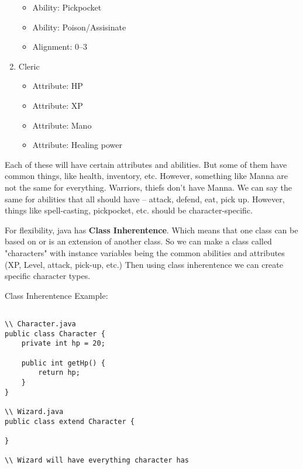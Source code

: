 \documentclass [12 pt, twoside] {article}
\begin{document}
\begin{enumerate}
\begin{itemize}
			\item Ability: Pickpocket
			\item Ability: Poison/Assisinate
			\item Alignment: 0--3
		\end{itemize}
	\item Cleric
		\begin{itemize}
			\item Attribute: HP
			\item Attribute: XP
			\item Attribute: Mano
			\item Attribute: Healing power
		\end{itemize}
\end{enumerate}


Each of these will have certain attributes and abilities.
But some of them have common things, like health, inventory, etc.
However, something like Manna are not the same for everything.
Warriors, thiefs don't have Manna.
We can say the same for abilities that all should have -- attack,
defend, eat, pick up. However, things like spell-casting, pickpocket,
etc. should be character-specific.


For flexibility, java has \textbf{Class Inherentence}. Which means
that one class can be based on or is an extension of another class.
So we can make a class called "characters" with instance variables
being the common abilities and attributes (XP, Level, attack, pick-up, 
etc.) Then using class inherentence we can create specific character types.


Class Inherentence Example:
\begin{lstlisting}

\\ Character.java
public class Character {
	private int hp = 20;

	public int getHp() {
		return hp;
	}
}

\\ Wizard.java
public class extend Character {

}

\\ Wizard will have everything character has
\end{lstlisting}
\end{document}
